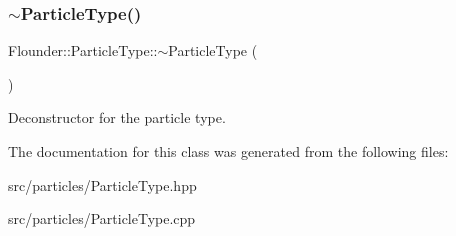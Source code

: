 \subsubsection{\texorpdfstring{$\sim$\+Particle\+Type()}{~ParticleType()}}
{\footnotesize\ttfamily Flounder\+::\+Particle\+Type\+::$\sim$\+Particle\+Type (\begin{DoxyParamCaption}{ }\end{DoxyParamCaption})}



Deconstructor for the particle type. 



The documentation for this class was generated from the following files\+:\begin{DoxyCompactItemize}
\item 
src/particles/Particle\+Type.\+hpp\item 
src/particles/Particle\+Type.\+cpp\end{DoxyCompactItemize}
